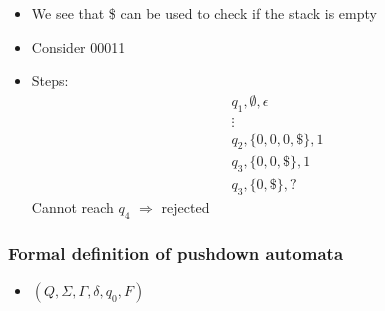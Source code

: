 \begin{frame}[allowframebreaks]
\begin{itemize}
\item We see that \$ can be used to check
  if the stack is empty

\item Consider 00011
\item [] Steps:
  \begin{equation*}
    \begin{split}
& q_1, \emptyset, \epsilon\\
& \vdots\\
& q_2, \{0,0,0, \$\}, 1\\
& q_3, \{0,0, \$\}, 1\\
& q_3, \{0, \$\}, ?
\end{split}
\end{equation*}
Cannot reach $q_4$ $\Rightarrow$ rejected  
\end{itemize}\end{frame} \begin{frame}[allowframebreaks] \frametitle{Formal definition of pushdown automata}
  \begin{itemize}  
\item $(Q,\Sigma, \Gamma, \delta, q_0, F)$


\end{itemize}
\end{frame}
